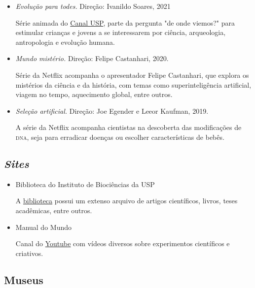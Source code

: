 \documentclass[11pt]{extarticle}
\begin{document}
\begin{itemize}
\item \emph{Evolução para todes.} Direção: Ivanildo Soares, 2021

Série animada do \href{https://www.youtube.com/watch?v=d_4hLpzRh1A}{Canal USP}, parte da pergunta "de onde viemos?" para estimular crianças e jovens a se interessarem por ciência, arqueologia, antropologia e evolução humana.

\item \emph{Mundo mistério.} Direção: Felipe Castanhari, 2020.

Série da Netflix acompanha o apresentador Felipe Castanhari, que explora os mistérios da ciência e da história,
com temas como superinteligência artificial, viagem no tempo, aquecimento global, entre outros.

\item \emph{Seleção artificial.} Direção: Joe Egender e Leeor Kaufman, 2019.

A série da Netflix acompanha cientistas na descoberta das modificações de \textsc{dna},
seja para erradicar doenças ou escolher características de bebês.

\end{itemize}

\subsection{\emph{Sites}}

\begin{itemize}

\item Biblioteca do Instituto de Biociências da USP

A \href{https://biblioteca.ib.usp.br/}{biblioteca} possui um extenso arquivo de artigos científicos, livros, teses acadêmicas, entre outros.

\item Manual do Mundo

Canal do \href{https://www.youtube.com/user/iberethenorio}{Youtube} com vídeos diversos sobre experimentos científicos e criativos.
\end{itemize}


\subsection{Museus}
\end{document}
